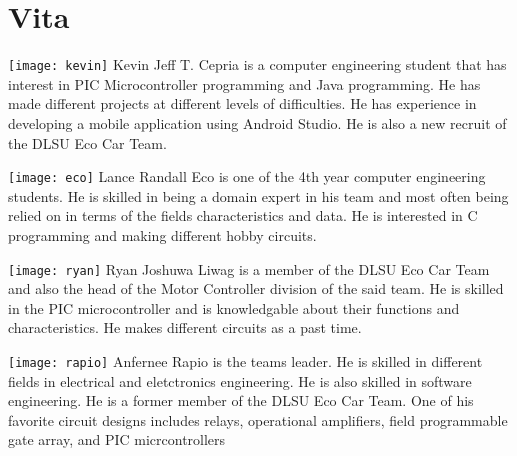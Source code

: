 \chapter{Vita}


{
\vfill

\texttt{[image: kevin]}
Kevin Jeff T. Cepria is a computer engineering student that has interest in PIC Microcontroller programming and Java programming. He has made different projects at different levels of difficulties. He has experience in developing a mobile application using Android Studio. He is also a new recruit of the DLSU Eco Car Team.\vspace{5mm} 


	\texttt{[image: eco]}
	Lance Randall Eco is one of the 4th year computer engineering students. He is skilled in being a domain expert in his team and most often being relied on in terms of the fields characteristics and data. He is interested in C programming and making different hobby circuits.\vspace{5mm} 

\texttt{[image: ryan]}
Ryan Joshuwa Liwag is a member of the DLSU Eco Car Team and also the head of the Motor Controller division of the said team. He is skilled in the PIC microcontroller and is knowledgable about their functions and characteristics. He makes different circuits as a past time.\vspace{5mm} 

\texttt{[image: rapio]}
Anfernee Rapio is the teams leader. He is skilled in different fields in electrical and eletctronics engineering. He is also skilled in software engineering. He is a former member of the DLSU Eco Car Team. One of his favorite circuit designs includes relays, operational amplifiers, field programmable gate array, and PIC micrcontrollers\vspace{5mm} 


}